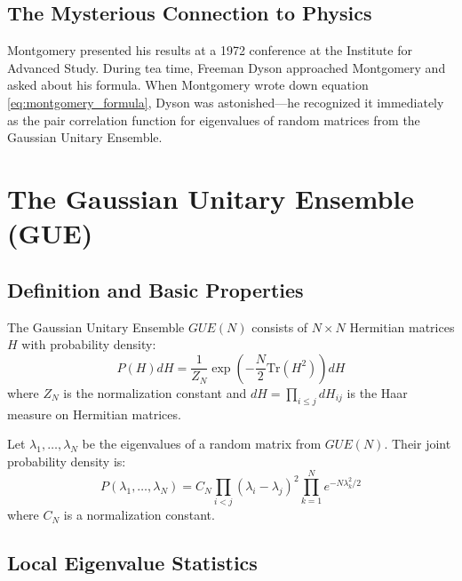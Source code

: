 \subsection{The Mysterious Connection to Physics}

\begin{historicalnote}
Montgomery presented his results at a 1972 conference at the Institute for Advanced Study. During tea time, Freeman Dyson approached Montgomery and asked about his formula. When Montgomery wrote down equation \eqref{eq:montgomery_formula}, Dyson was astonished—he recognized it immediately as the pair correlation function for eigenvalues of random matrices from the Gaussian Unitary Ensemble.
\end{historicalnote}

\section{The Gaussian Unitary Ensemble (GUE)}
\label{sec:gue}

\subsection{Definition and Basic Properties}

\begin{definition}
\label{def:gue}
The Gaussian Unitary Ensemble $GUE(N)$ consists of $N \times N$ Hermitian matrices $H$ with probability density:
\begin{equation}
P(H) dH = \frac{1}{Z_N} \exp\left(-\frac{N}{2} \text{Tr}(H^2)\right) dH
\label{eq:gue_measure}
\end{equation}
where $Z_N$ is the normalization constant and $dH = \prod_{i \leq j} dH_{ij}$ is the Haar measure on Hermitian matrices.
\end{definition}

\begin{theorem}
\label{thm:gue_eigenvalues}
Let $\lambda_1, \ldots, \lambda_N$ be the eigenvalues of a random matrix from $GUE(N)$. Their joint probability density is:
\begin{equation}
P(\lambda_1, \ldots, \lambda_N) = C_N \prod_{i < j} (\lambda_i - \lambda_j)^2 \prod_{k=1}^N e^{-N\lambda_k^2/2}
\label{eq:gue_eigenvalue_density}
\end{equation}
where $C_N$ is a normalization constant.
\end{theorem}

\subsection{Local Eigenvalue Statistics}

